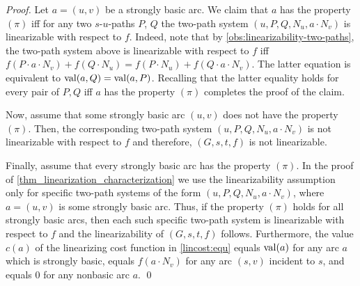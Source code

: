 \begin{proof}
    Let $a = (u, v)$ be a strongly basic arc. We claim that $a$ has the property $(\pi)$ iff for any two  $s$-$u$-paths $P$, $Q$  the two-path system $(u,P,Q,N_u,a \cdot N_v)$ is linearizable with respect to $f$. Indeed, note that by \cref{obs:linearizability-two-paths}, the   two-path system above is linearizable with respect to $f$  iff $f(P \cdot a \cdot N_v) + f(Q \cdot N_u) = f(P \cdot N_u) + f(Q \cdot a \cdot N_v)$. The latter equation is equivalent to $\operatorname{val}(a,Q) = \operatorname{val}(a,P)$. Recalling that  the latter equality  
     holds for every pair of $P, Q$ iff $a$ has the property $(\pi)$ completes the proof of the claim.
    
    Now, assume that some strongly basic arc $(u,v)$ does not have the property $(\pi)$. Then, the corresponding two-path system $(u,P,Q,N_u,a \cdot N_v)$ is not linearizable with respect to $f$ and therefore,  $(G,s,t,f)$ is  not linearizable.
    
    Finally, assume that every strongly basic arc has the property $(\pi)$. 
  In the proof of \cref{thm_linearization_characterization}
    we  use the linearizability assumption   only for  specific two-path systems  of the  form $(u, P, Q, N_u, a \cdot N_v)$,  where   $a = (u, v)$ is some strongly basic arc. Thus,  if the property $(\pi)$ holds for all strongly basic arcs, then  each such specific two-path system is linearizable with respect to $f$ and the linearizability of $(G,s,t,f)$ follows. Furthermore, the value $c(a)$ of the linearizing cost function in \cref{lincost:equ}   equals  $\operatorname{val}(a)$ for  any arc $a$ which is  strongly basic, equals $f(a \cdot N_v)$ for any arc $(s,v)$ incident to $s$, and equals $0$ for any   nonbasic arc $a$. 
    \qed
\end{proof}

